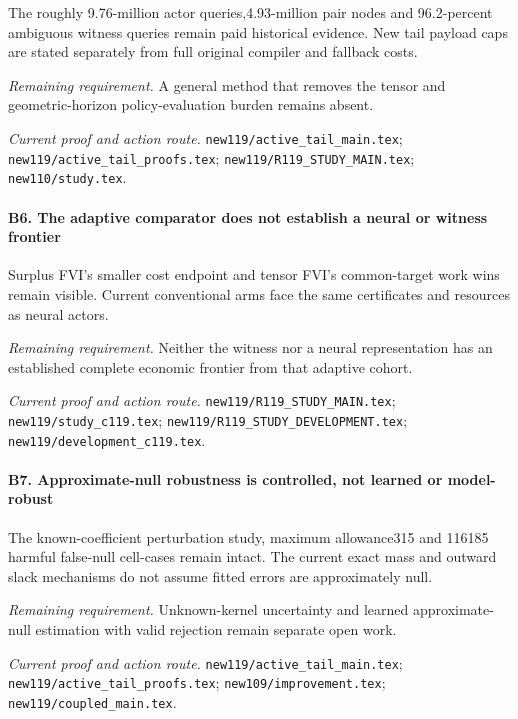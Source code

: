 The roughly 9.76-million actor queries,4.93-million pair nodes and 96.2-percent ambiguous witness queries remain paid historical evidence. New tail payload caps are stated separately from full original compiler and fallback costs.

\par\emph{Remaining requirement.} A general method that removes the tensor and geometric-horizon policy-evaluation burden remains absent.

\par\emph{Current proof and action route.} \nolinkurl{new119/active_tail_main.tex}; \nolinkurl{new119/active_tail_proofs.tex}; \nolinkurl{new119/R119_STUDY_MAIN.tex}; \nolinkurl{new110/study.tex}.

\paragraph{B6. The adaptive comparator does not establish a neural or witness frontier}

Surplus FVI's smaller cost endpoint and tensor FVI's common-target work wins remain visible. Current conventional arms face the same certificates and resources as neural actors.

\par\emph{Remaining requirement.} Neither the witness nor a neural representation has an established complete economic frontier from that adaptive cohort.

\par\emph{Current proof and action route.} \nolinkurl{new119/R119_STUDY_MAIN.tex}; \nolinkurl{new119/study_c119.tex}; \nolinkurl{new119/R119_STUDY_DEVELOPMENT.tex}; \nolinkurl{new119/development_c119.tex}.

\paragraph{B7. Approximate-null robustness is controlled, not learned or model-robust}

The known-coefficient perturbation study, maximum allowance315 and 116185 harmful false-null cell-cases remain intact. The current exact mass and outward slack mechanisms do not assume fitted errors are approximately null.

\par\emph{Remaining requirement.} Unknown-kernel uncertainty and learned approximate-null estimation with valid rejection remain separate open work.

\par\emph{Current proof and action route.} \nolinkurl{new119/active_tail_main.tex}; \nolinkurl{new119/active_tail_proofs.tex}; \nolinkurl{new109/improvement.tex}; \nolinkurl{new119/coupled_main.tex}.

